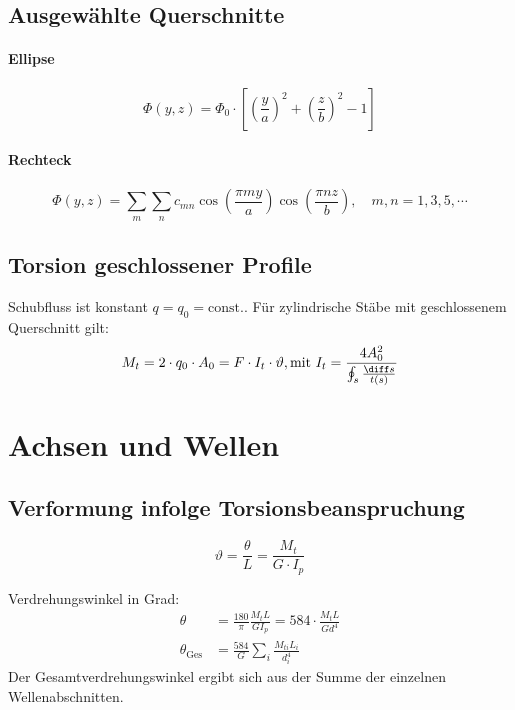 	\subsection{Ausgewählte Querschnitte} %
		\paragraph{Ellipse} %
			\begin{equation*}
				\Phi(y,z) = \Phi_0 \cdot \left[ \left( \frac{y}{a}\right)^2 + \left( \frac{z}{b}\right)^2 -1\right]
			\end{equation*}
		\paragraph{Rechteck} %
			\begin{equation*}
				\Phi(y,z) = \sum_m \sum_n c_{mn} \cos \left( \frac{\pi m y}{a}\right) \cos \left( \frac{\pi n z}{b}\right), \quad m,n = 1, 3, 5, \cdots
			\end{equation*}
	\subsection{Torsion geschlossener Profile} %
		Schubfluss ist konstant $q = q_0 = \text{const.}$. Für zylindrische Stäbe mit geschlossenem Querschnitt gilt:
		\begin{equation*}
			M_t = 2 \cdot q_0 \cdot A_0 = F \cdot I_t \cdot \vartheta, \text{mit } I_t = \frac{4 A_0^2}{\oint_s \frac{\diff s}{t(s)}}
		\end{equation*}
\section{Achsen und Wellen} %
	\subsection{Verformung infolge Torsionsbeanspruchung} %
		\begin{equation*}
			\vartheta = \frac{\theta}{L} = \frac{M_t}{G \cdot I_p}
		\end{equation*}

		Verdrehungswinkel in Grad:
		\begin{align*}
			\theta &= \frac{180}{\pi} \frac{M_t L}{G I_p} = 584 \cdot \frac{M_t L}{G d^4} \\
			\theta_\text{Ges} &= \frac{584}{G} \sum_i \frac{M_{ti} L_i}{d_i^4}
		\end{align*}
		Der Gesamtverdrehungswinkel ergibt sich aus der Summe der einzelnen Wellenabschnitten.
